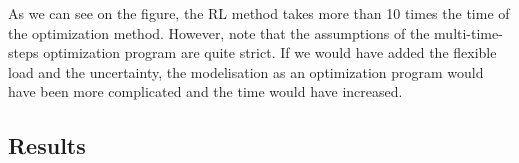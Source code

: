 As we can see on the figure, the RL method takes more than 10 times the time of the optimization method.
However, note that the assumptions of the multi-time-steps optimization program are quite strict.
If we would have added the flexible load and the uncertainty, the modelisation as an optimization program would have been more complicated and the time would have increased. 

\subsection{Results}
